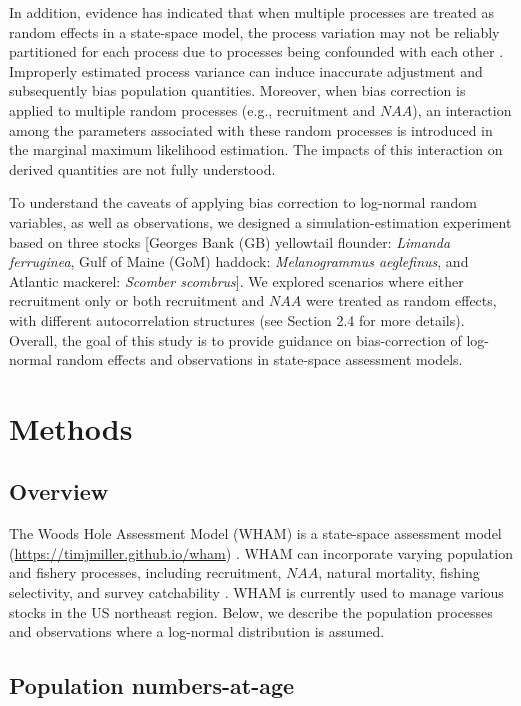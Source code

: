 \documentclass[
  12pt,
]{article}
\begin{document}
In addition, evidence has indicated that when multiple processes are
treated as random effects in a state-space model, the process variation
may not be reliably partitioned for each process due to processes being
confounded with each other
\citep{Trijoulet2020, Li2024, Liljestrand2024}. Improperly estimated
process variance can induce inaccurate adjustment and subsequently bias
population quantities. Moreover, when bias correction is applied to
multiple random processes (e.g., recruitment and \(NAA\)), an
interaction among the parameters associated with these random processes
is introduced in the marginal maximum likelihood estimation. The impacts
of this interaction on derived quantities are not fully understood.

To understand the caveats of applying bias correction to log-normal
random variables, as well as observations, we designed a
simulation-estimation experiment based on three stocks {[}Georges Bank
(GB) yellowtail flounder: \emph{Limanda ferruginea}, Gulf of Maine (GoM)
haddock: \emph{Melanogrammus aeglefinus}, and Atlantic mackerel:
\emph{Scomber scombrus}{]}. We explored scenarios where either
recruitment only or both recruitment and \(NAA\) were treated as random
effects, with different autocorrelation structures (see Section 2.4 for
more details). Overall, the goal of this study is to provide guidance on
bias-correction of log-normal random effects and observations in
state-space assessment models.

\hypertarget{methods}{%
\section{Methods}\label{methods}}

\hypertarget{overview}{%
\subsection{Overview}\label{overview}}

The Woods Hole Assessment Model (WHAM) is a state-space assessment model
(\url{https://timjmiller.github.io/wham}) \citep{Stock2021}. WHAM can
incorporate varying population and fishery processes, including
recruitment, \(NAA\), natural mortality, fishing selectivity, and survey
catchability \citep{Stock2021}. WHAM is currently used to manage various
stocks in the US northeast region. Below, we describe the population
processes and observations where a log-normal distribution is assumed.

\hypertarget{population-numbers-at-age}{%
\subsection{Population numbers-at-age}\label{population-numbers-at-age}}
\end{document}
